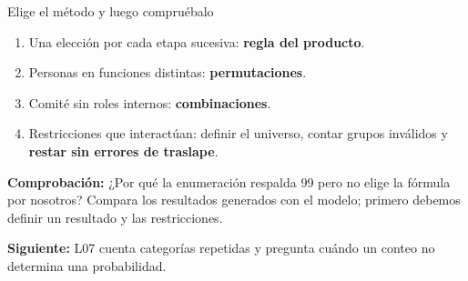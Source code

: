 \documentclass[aspectratio=169,10pt,spanish]{beamer}
\begin{document}
\begin{frame}{Elige el método y luego compruébalo}
\small
\begin{enumerate}
\item Una elección por cada etapa sucesiva: \textbf{regla del producto}.
\item Personas en funciones distintas: \textbf{permutaciones}.
\item Comité sin roles internos: \textbf{combinaciones}.
\item Restricciones que interactúan: definir el universo, contar grupos inválidos y \textbf{restar sin errores de traslape}.
\end{enumerate}
\par\medskip
\textbf{Comprobación:} ¿Por qué la enumeración respalda 99 pero no elige la fórmula por nosotros? Compara los resultados generados con el modelo; primero debemos definir un resultado y las restricciones.
\par\smallskip
\textbf{Siguiente:} L07 cuenta categorías repetidas y pregunta cuándo un conteo no determina una probabilidad.
\end{frame}
\end{document}
